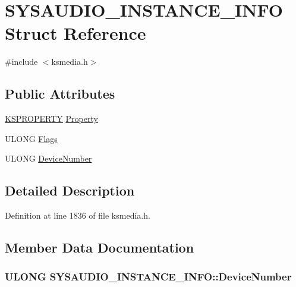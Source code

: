 \hypertarget{struct_s_y_s_a_u_d_i_o___i_n_s_t_a_n_c_e___i_n_f_o}{}\section{S\+Y\+S\+A\+U\+D\+I\+O\+\_\+\+I\+N\+S\+T\+A\+N\+C\+E\+\_\+\+I\+N\+FO Struct Reference}
\label{struct_s_y_s_a_u_d_i_o___i_n_s_t_a_n_c_e___i_n_f_o}


{\ttfamily \#include $<$ksmedia.\+h$>$}

\subsection*{Public Attributes}
\begin{DoxyCompactItemize}
\item 
\hyperlink{ks_8h_a4392f77c74e868d813d46c39ada4d660}{K\+S\+P\+R\+O\+P\+E\+R\+TY} \hyperlink{struct_s_y_s_a_u_d_i_o___i_n_s_t_a_n_c_e___i_n_f_o_afa4397c0635273446387bdc123236e4b}{Property}
\item 
U\+L\+O\+NG \hyperlink{struct_s_y_s_a_u_d_i_o___i_n_s_t_a_n_c_e___i_n_f_o_a9d8a010d0df392275b8c28b09360edee}{Flags}
\item 
U\+L\+O\+NG \hyperlink{struct_s_y_s_a_u_d_i_o___i_n_s_t_a_n_c_e___i_n_f_o_aa03ad35de3de50a14ad614011dc212cb}{Device\+Number}
\end{DoxyCompactItemize}


\subsection{Detailed Description}


Definition at line 1836 of file ksmedia.\+h.



\subsection{Member Data Documentation}
\subsubsection[{\texorpdfstring{Device\+Number}{DeviceNumber}}]{\setlength{\rightskip}{0pt plus 5cm}U\+L\+O\+NG S\+Y\+S\+A\+U\+D\+I\+O\+\_\+\+I\+N\+S\+T\+A\+N\+C\+E\+\_\+\+I\+N\+F\+O\+::\+Device\+Number}\hypertarget{struct_s_y_s_a_u_d_i_o___i_n_s_t_a_n_c_e___i_n_f_o_aa03ad35de3de50a14ad614011dc212cb}{}\label{struct_s_y_s_a_u_d_i_o___i_n_s_t_a_n_c_e___i_n_f_o_aa03ad35de3de50a14ad614011dc212cb}


